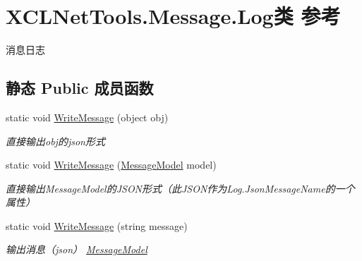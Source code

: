 \hypertarget{class_x_c_l_net_tools_1_1_message_1_1_log}{}\section{X\+C\+L\+Net\+Tools.\+Message.\+Log类 参考}
\label{class_x_c_l_net_tools_1_1_message_1_1_log}


消息日志  


\subsection*{静态 Public 成员函数}
\begin{DoxyCompactItemize}
\item 
static void \hyperlink{class_x_c_l_net_tools_1_1_message_1_1_log_aac683d4043b6c9ac98f74d5f95dfa6f0}{Write\+Message} (object obj)
\begin{DoxyCompactList}\small\item\em 直接输出obj的json形式 \end{DoxyCompactList}\item 
static void \hyperlink{class_x_c_l_net_tools_1_1_message_1_1_log_a6038d85fedb63a3fe5dc306f1bf30011}{Write\+Message} (\hyperlink{class_x_c_l_net_tools_1_1_message_1_1_message_model}{Message\+Model} model)
\begin{DoxyCompactList}\small\item\em 直接输出\+Message\+Model的\+J\+S\+O\+N形式（此\+J\+S\+O\+N作为\+Log.\+Json\+Message\+Name的一个属性） \end{DoxyCompactList}\item 
static void \hyperlink{class_x_c_l_net_tools_1_1_message_1_1_log_a0f758d51c0cf8dd92645d44f1773715c}{Write\+Message} (string message)
\begin{DoxyCompactList}\small\item\em 输出消息（json） \hyperlink{class_x_c_l_net_tools_1_1_message_1_1_message_model}{Message\+Model} \end{DoxyCompactList}\end{DoxyCompactItemize}
